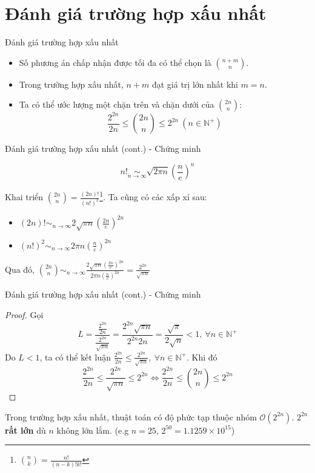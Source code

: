 \documentclass[10pt]{beamer}
\begin{document}
\section{Đánh giá trường hợp xấu nhất}
\begin{frame}{Đánh giá trường hợp xấu nhất}
\begin{itemize}
\item Số phương án chấp nhận được tối đa có thể chọn là $\displaystyle \binom{n + m}{n}$.
\item Trong trường hợp xấu nhất, $n + m$ đạt giá trị lớn nhất khi $m = n$.
\item Ta có thể ước lượng một chặn trên và chặn dưới của $\displaystyle \binom{2n}{n}$\cite{Vanderbei2020}:
$$
\frac{2^{2n}}{2n} \leq \binom{2n}{n} \leq 2^{2n} \ (n \in \mathbb{N^+})
$$
\end{itemize}
\end{frame}
\begin{frame}{Đánh giá trường hợp xấu nhất (cont.) - Chứng minh}
\begin{theorem}
$$
\displaystyle
n! \operatorname*{\sim}_{n\to\infty} \sqrt{2\pi n}\left(\frac{n}{e}\right)^n
$$
\end{theorem}
Khai triển $\displaystyle \binom{2n}{n} = \frac{(2n)!}{(n!)^2}$\footnote{$\binom{n}{k} = \frac{n!}{(n - k)!k!}$}. Ta cũng có các xấp xỉ sau:
\begin{itemize}
\item $\displaystyle (2n)! \operatorname*{\sim}_{n\to\infty} 2\sqrt{\pi n} \left(\frac{2n}{e}\right)^{2n}$ 
\item $\displaystyle (n!)^2 \operatorname*{\sim}_{n\to\infty} 2\pi n \left(\frac{n}{e}\right)^{2n}$ 
\end{itemize}
Qua đó, $\displaystyle \binom{2n}{n} \operatorname*{\sim}_{n\to\infty} \frac{2\sqrt{\pi n} \left(\frac{2n}{e}\right)^{2n}}{2\pi n \left(\frac{n}{e}\right)^{2n}} =  \frac{2^{2n}}{\sqrt{\pi n}}$
\end{frame}

\begin{frame}{Đánh giá trường hợp xấu nhất (cont.) - Chứng minh}
\begin{proof}
Gọi
$$
\displaystyle
L = \frac{\frac{2^{2n}}{2n}}{\frac{2^{2n}}{\sqrt{\pi n}}} = \frac{2^{2n}\sqrt{\pi n}}{2^{2n} 2n} = \frac{\sqrt{\pi}}{2\sqrt{n}} < 1,\ \forall n \in \mathbb{N^+}
$$
Do $L < 1$, ta có thể kết luận $\frac{2^{2n}}{2n} \leq \frac{2^{2n}}{\sqrt{\pi n}},\ \forall n \in \mathbb{N^+}
$. Khi đó
$$
\displaystyle
\frac{2^{2n}}{2n} \leq \frac{2^{2n}}{\sqrt{\pi n}} \leq 2^{2n} \iff \frac{2^{2n}}{2n} \leq \binom{2n}{n} \leq 2^{2n}
$$
\end{proof}
Trong trường hợp xấu nhất, thuật toán có độ phức tạp thuộc nhóm $\mathcal{O}(2^{2n})$. $2^{2n}$ \textbf{rất lớn} dù $n$ không lớn lắm. (e.g $n = 25$, $2^{50} = 1.1259\times 10^{15}$)
\end{frame}
\end{document}
